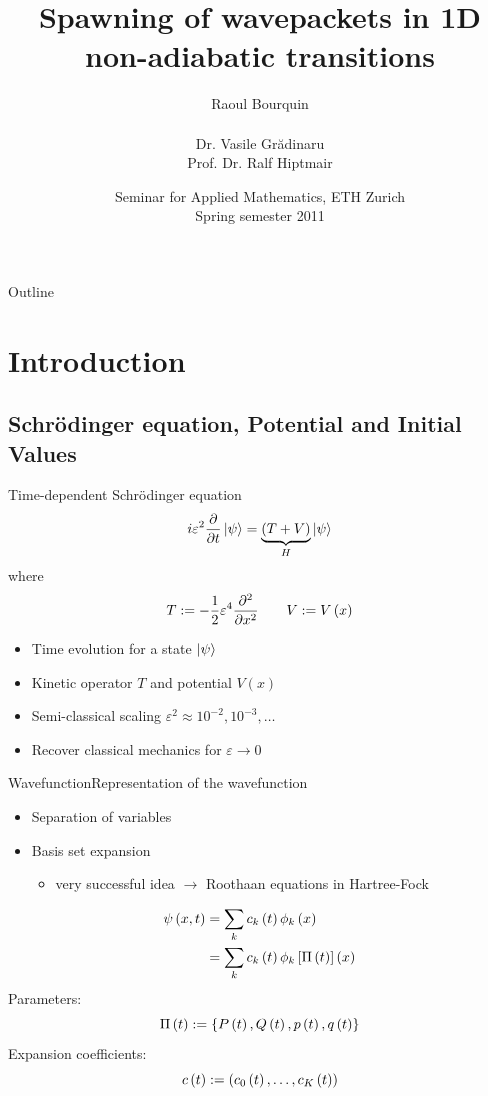 \documentclass{beamer}
\title[Spawning in the non-adiabatic setting]{Spawning of wavepackets in 1D\\ non-adiabatic transitions}
\author[]{Raoul Bourquin\\~\\ Dr. Vasile Gr\u{a}dinaru\\ Prof. Dr. Ralf Hiptmair}
\date{Seminar for Applied Mathematics, ETH Zurich \\Spring semester 2011}
\begin{document}
\begin{frame}
  \titlepage
\end{frame}


\begin{frame}{Outline}
  \tableofcontents
\end{frame}


\section{Introduction}
\subsection{Schrödinger equation, Potential and Initial Values}


\begin{frame}{Time-dependent Schrödinger equation}
  \begin{equation*} \label{eq:basics_tdse_semi}
    i \varepsilon^2 \frac{\partial}{\partial t} \Ket{\psi} = \underbrace{\left(T+V\right)}_{H} \Ket{\psi}
  \end{equation*}
  where
  \begin{equation*}
    T := - \frac{1}{2} \varepsilon^4 \frac{\partial^2}{\partial x^2} \qquad
    V := V\left( x \right)
  \end{equation*}
  \begin{itemize}
    \item Time evolution for a state $\Ket{\psi}$
    \item Kinetic operator $T$ and potential $V\left( x \right)$
    \item Semi-classical scaling $\varepsilon^2 \approx 10^{-2}, 10^{-3}, \ldots$
    \item Recover classical mechanics for $\varepsilon \rightarrow 0$
  \end{itemize}
\end{frame}


\begin{frame}{Wavefunction}{Representation of the wavefunction}
  \begin{itemize}
    \item Separation of variables
    \item Basis set expansion
    \begin{itemize}
      \item very successful idea $\rightarrow$ Roothaan equations in Hartree-Fock
    \end{itemize}
  \end{itemize}
  \begin{align*}
    \psi\left( x,t \right) & = \sum_k c_k\left( t \right) \phi_k\left( x \right) \\
                     & = \sum_k c_k\left( t \right) \phi_k\left[\Pi\left( t \right)\right]\left( x \right)
  \end{align*}
  Parameters:
  \begin{equation*}
    \Pi\left( t \right) := \{P\left( t \right), Q\left( t \right), p\left( t \right), q\left( t \right)\}
  \end{equation*}
  Expansion coefficients:
  \begin{equation*}
    c\left( t \right) := \left( c_0\left( t \right), \ldots, c_K\left( t \right) \right)
  \end{equation*}
\end{frame}
\end{document}
